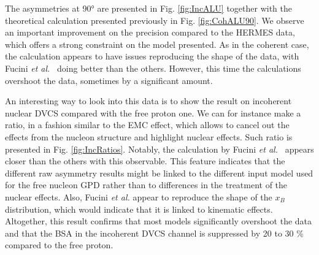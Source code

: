 \documentclass{article}
\begin{document}
The asymmetries at 90° are presented in Fig. \ref{fig:IncALU} together with the theoretical
calculation presented previously in Fig. \ref{fig:CohALU90}. We observe an important improvement
on the precision compared to 
the HERMES data, which offers a strong constraint on the model presented. As in the
coherent case, the calculation appears to have issues reproducing the shape of the data,
with Fucini {\it et al.}~\cite{Fucini:2019xlc} doing better than the others.
However, this time the calculations overshoot the data, sometimes by a significant amount.

An interesting way to look into this data is to show the result on incoherent nuclear DVCS compared 
with the free proton one. We can for instance make a ratio, in a fashion similar to the EMC 
effect, which allows to cancel out
the effects from the nucleon structure and highlight nuclear effects. Such ratio is presented
in Fig. \ref{fig:IncRatios}.
Notably, the calculation by Fucini {\it et al.}~\cite{Fucini:2019xlc} appears closer than the
others with this observable. This feature indicates that the different raw asymmetry results might be 
linked to the different input model used for the free nucleon GPD rather than to differences in the 
treatment of the nuclear effects. Also, Fucini {\it et al.} appear to reproduce the 
shape of the $x_B$ distribution, which would indicate that it is linked to kinematic effects.
Altogether, this result confirms that most models significantly overshoot the data and that 
the BSA in the incoherent DVCS channel is suppressed by 20 to 30 \% compared to the free proton.
\end{document}
